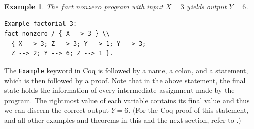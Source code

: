 \documentclass[compsoc,conference,a4paper,10pt,times]{IEEEtran}
\newtheorem{example}[theorem]{Example}
\begin{document}
\begin{example}\label{firstoff}
    The $fact\_nonzero$ program with input $X=3$ yields output $Y=6$.  
\begin{verbatim}
Example factorial_3: 
fact_nonzero / { X --> 3 } \\
  { X --> 3; Z --> 3; Y --> 1; Y --> 3; 
  Z --> 2; Y --> 6; Z --> 1 }.
\end{verbatim}
\end{example}
    The \texttt{Example} keyword in Coq is followed by a name, a colon, and a statement, which is then followed by a proof. Note that in the above statement, the final state holds the information of every intermediate assignment made by the program.  The rightmost value of each variable contains its final value and thus we can discern the correct output $Y=6$.  
    (For the Coq proof of this statement, and all other examples and theorems in this and the next section, refer to \cite{WeiRepo}.)
    
%    
    
\end{document}
